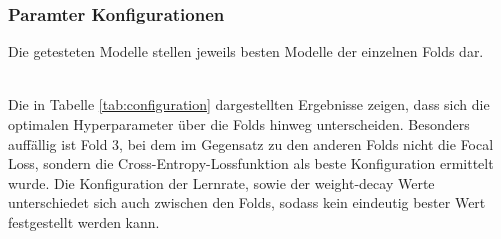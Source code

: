\documentclass[12pt,DIV=15,BCOR=15mm,twoside,headsepline,abstract=true,listof=totoc,bibliography=totoc]{scrreprt}
\theoremstyle{remark}    %
\begin{document}
    \subsubsection{Paramter Konfigurationen}
    Die getesteten Modelle stellen jeweils besten Modelle der einzelnen Folds dar. \\\\
    \begin{table}[ht]
        \centering
        \caption{Beste Konfigurationen auf den einzelnen Folds}
        \label{tab:configuration}
        \setlength{\tabcolsep}{5pt} 
        \renewcommand{\arraystretch}{1.3}
    \end{table}\noindent
    Die in Tabelle \ref{tab:configuration} dargestellten Ergebnisse zeigen, dass sich die optimalen Hyperparameter über die Folds hinweg 
    unterscheiden. Besonders auffällig ist Fold 3, bei dem im Gegensatz zu den anderen Folds nicht die Focal Loss, sondern die 
    Cross-Entropy-Lossfunktion als beste Konfiguration ermittelt wurde. Die Konfiguration der Lernrate, sowie der weight-decay 
    Werte unterschiedet sich auch zwischen den Folds, sodass kein eindeutig bester Wert festgestellt werden kann.
\end{document}
